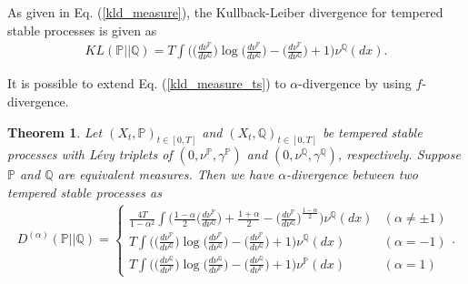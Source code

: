 \documentclass[preprint,11pt]{amsart}
\newtheorem{thm}{Theorem}
\begin{document}
	As given in Eq. (\ref{kld_measure}), the Kullback-Leiber divergence for tempered stable processes is given \cite{cont2004nonparametric,kim2007relative} as
	\begin{align}
	\label{kld_measure_ts}
		KL(\mathbb{P}||\mathbb{Q})=T \int \Big(\Big(\frac{d\nu^\mathbb{P}}{d\nu^\mathbb{Q}}\Big) \log{\Big(\frac{d\nu^\mathbb{P}}{d\nu^\mathbb{Q}}\Big)}- \Big(\frac{d\nu^\mathbb{P}}{d\nu^\mathbb{Q}}\Big)+1\Big) \nu^\mathbb{Q}(dx).
	\end{align}
	
	It is possible to extend Eq. (\ref{kld_measure_ts}) to $\alpha$-divergence by using $f$-divergence. 
	\begin{thm}
	\label{thm_div_ts}
	Let $(X_t, \mathbb{P})_{t\in[0,T]}$ and $(X_t, \mathbb{Q})_{t\in[0,T]}$ be tempered stable processes with L\'evy triplets of $(0,\nu^\mathbb{P},\gamma^{\mathbb{P}})$ and $(0,\nu^\mathbb{Q},\gamma^{\mathbb{Q}})$, respectively. Suppose $\mathbb{P}$ and $\mathbb{Q}$ are equivalent measures. Then we have $\alpha$-divergence between two tempered stable processes as
	 \begin{align}
	 \label{a_div_measure_ts}
	D^{(\alpha )}(\mathbb{P}||\mathbb{Q})=\left\{ 
	\begin{array}{ll}
	\frac{4T}{1-\alpha ^{2}}\int \Big(\frac{1-\alpha}{2}\Big(\frac{d\nu^\mathbb{P}}{d\nu^\mathbb{Q}}\Big) +\frac{1+\alpha}{2}-\Big(\frac{d\nu^\mathbb{P}}{d\nu^\mathbb{Q}}\Big)^{\frac{1-\alpha}{2}}\Big) \nu^\mathbb{Q}(dx) & (\alpha \neq \pm 1)\\ 
	T\int \Big(\Big(\frac{d\nu^\mathbb{P}}{d\nu^\mathbb{Q}}\Big) \log{\Big(\frac{d\nu^\mathbb{P}}{d\nu^\mathbb{Q}}\Big)}- \Big(\frac{d\nu^\mathbb{P}}{d\nu^\mathbb{Q}}\Big)+1\Big) \nu^\mathbb{Q}(dx) & (\alpha =-1)\\
	T\int \Big(\Big(\frac{d\nu^\mathbb{Q}}{d\nu^\mathbb{P}}\Big) \log{\Big(\frac{d\nu^\mathbb{Q}}{d\nu^\mathbb{P}}\Big)}- \Big(\frac{d\nu^\mathbb{Q}}{d\nu^\mathbb{P}}\Big)+1\Big) \nu^\mathbb{P}(dx) & (\alpha =1)
	\end{array}
	\right..
	\end{align}
	\end{thm}
\end{document}
